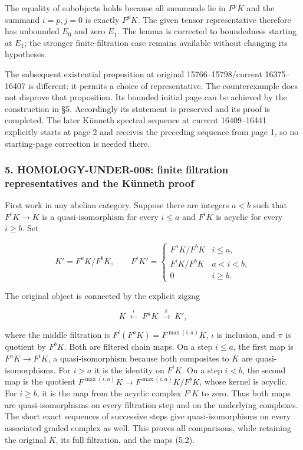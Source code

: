 \documentclass[11pt]{article}
\begin{document}
The equality of subobjects holds because all summands lie in \(F^pK\) and the summand \(i=p,j=0\) is exactly \(F^pK\). The given tensor representative therefore has unbounded \(E_0\) and zero \(E_1\). The lemma is corrected to boundedness starting at \(E_1\); the stronger finite-filtration case remains available without changing its hypotheses.

The subsequent existential proposition at original 15766--15798/current 16375--16407 is different: it permits a choice of representative. The counterexample does not disprove that proposition. Its bounded initial page can be achieved by the construction in §5. Accordingly its statement is preserved and its proof is completed. The later Künneth spectral sequence at current 16409--16441 explicitly starts at page 2 and receives the preceding sequence from page 1, so no starting-page correction is needed there.

\subsubsection{5. HOMOLOGY-UNDER-008: finite filtration representatives and the Künneth proof}\label{homology-under-008-finite-filtration-representatives-and-the-kuxfcnneth-proof}

First work in any abelian category. Suppose there are integers \(a<b\) such that \(F^iK\to K\) is a quasi-isomorphism for every \(i\leq a\) and \(F^iK\) is acyclic for every \(i\geq b\). Set

\[
K'=F^aK/F^bK,
\qquad
F^iK'=
\begin{cases}
F^aK/F^bK&i\leq a,\\
F^iK/F^bK&a<i<b,\\
0&i\geq b.
\end{cases}                                  \tag{5.1}
\]

The original object is connected by the explicit zigzag

\[
K\ \xleftarrow{\iota}\ F^aK\ \xrightarrow{\pi}\ K',       \tag{5.2}
\]

where the middle filtration is \(F^i(F^aK)=F^{\max(i,a)}K\), \(\iota\) is inclusion, and \(\pi\) is quotient by \(F^bK\). Both are filtered chain maps. On a step \(i\leq a\), the first map is \(F^aK\to F^iK\), a quasi-isomorphism because both composites to \(K\) are quasi-isomorphisms. For \(i>a\) it is the identity on \(F^iK\). On a step \(i<b\), the second map is the quotient \(F^{\max(i,a)}K\to F^{\max(i,a)}K/F^bK\), whose kernel is acyclic. For \(i\geq b\), it is the map from the acyclic complex \(F^iK\) to zero. Thus both maps are quasi-isomorphisms on every filtration step and on the underlying complexes. The short exact sequences of successive steps give quasi-isomorphisms on every associated graded complex as well. This proves all comparisons, while retaining the original \(K\), its full filtration, and the maps (5.2).
\end{document}
